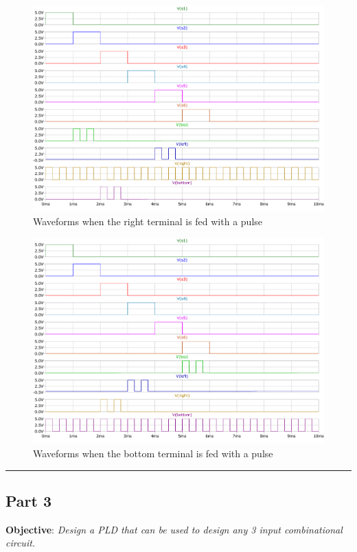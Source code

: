 \documentclass[a4paper,11pt]{article}%
\begin{document}
\begin{figure}[H]
	\centering
	\includegraphics[scale=0.5]{figures/2part2/right.pdf}
	\caption{Waveforms when the right terminal is fed with a pulse}
\end{figure}

\begin{figure}[H]
	\centering
	\includegraphics[scale=0.5]{figures/2part2/bottom.pdf}
	\caption{Waveforms when the bottom terminal is fed with a pulse}
\end{figure}


\hrule
\subsection{Part 3}
\textbf{Objective}: \textit{Design a PLD that can be used to design any 3 input
combinational circuit.}\\
\end{document}

